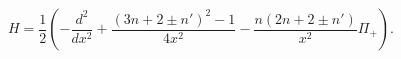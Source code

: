\begin{equation}
H=\frac{1}{2}\left(-\frac{d^2}{dx^2}+\frac{(3n
+2\pm n')^2-1}
{4x^2}- \frac{n(2n+2\pm n')}{x^2}\Pi_+\right).
\label{hami2}
\end{equation}

